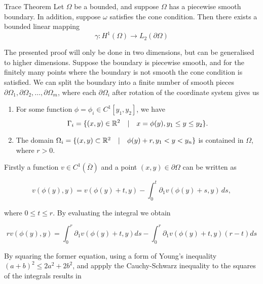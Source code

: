 \begin{defn}{Trace Theorem}\label{defn:trace}
    Let $\Omega$ be a bounded, and suppose $\Omega$ has a piecewise smooth boundary. In addition, suppose $\omega$ satisfies the cone condition. Then there exists a bounded linear mapping
    \begin{equation*}
        \gamma : H^1(\Omega) \to L_2(\partial \Omega)
    \end{equation*}
\end{defn}
\begin{bev}
    The presented proof will only be done in two dimensions, but can be generalised to higher dimensions.
    Suppose the boundary is piecewise smooth, and for the finitely many points where the boundary is not smooth the cone condition is satisfied. We can split the boundary into a finite number of smooth pieces $\partial \Omega_1, \partial \Omega_2, \dots, \partial \Omega_m$, where each $\partial \Omega_i$ after rotation of the coordinate system gives us

    \begin{enumerate}
        \item For some function $\phi = \phi_i \in C^1[y_1, y_2]$, we have
            \[ \Gamma_i = \{ (x,y) \in \mathbb{R}^2 \quad | \quad x = \phi(y), y_1 \leq y \leq y_2 \}. \]
        \item The domain $\Omega_i = \{ (x,y) \subset \mathbb{R}^2 \quad | \quad \phi(y) + r, y_1 < y < y_n \}$ is contained in $\Omega$, where $r > 0$.
    \end{enumerate}

    Firstly a function $v \in C^1(\bar{\Omega})$ and a point $(x,y) \in \partial \Omega$ can be written as

    \begin{equation}
        v(\phi(y), y) = v(\phi(y) + t, y) - \int_0^t \partial_1 v(\phi(y) + s, y) \, ds,
    \end{equation}

    where $0 \leq t \leq r$. By evaluating the integral we obtain

    \begin{equation}
        r v(\phi(y), y) = \int_0^r \partial_1 v(\phi(y) + t, y) ds - \int_0^r \partial_1 v(\phi(y) + t, y)(r-t) ds
    \end{equation}

    By squaring the former equation, using a form of Young's inequality ${(a+b)}^2 \leq 2a^2 + 2b^2$, and appply the Cauchy-Schwarz inequality to the squares of the integrals results in


\end{bev}

